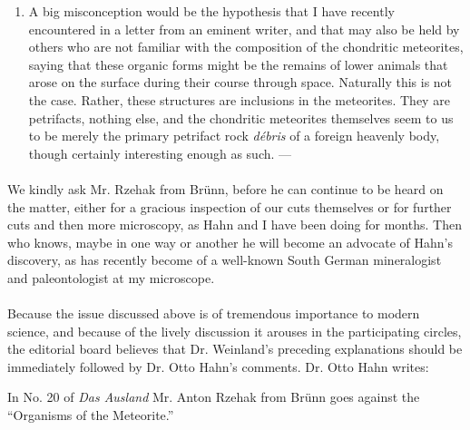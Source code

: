 \documentclass[a4paper, 12pt, oneside]{article}
\begin{document}
\begin{enumerate}
\item A big misconception would be the hypothesis that I have recently encountered in a letter from an eminent writer, and that may also be held by others who are not familiar with the composition of the chondritic meteorites, saying that these organic forms might be the remains of lower animals that arose on the surface during their course through space. Naturally this is not the case. Rather, these structures are inclusions in the meteorites. They are petrifacts, nothing else, and the chondritic meteorites themselves seem to us to be merely the primary petrifact rock \emph{débris} of a foreign heavenly body, though certainly interesting enough as such. ---
\end{enumerate}
\paragraph*{}
We kindly ask Mr. Rzehak from Brünn, before he can continue to be heard on the matter, either for a gracious inspection of our cuts themselves or for further cuts and then more microscopy, as Hahn and I have been doing for months. Then who knows, maybe in one way or another he will become an advocate of Hahn's discovery, as has recently become of a well-known South German mineralogist and paleontologist at my microscope.

%
\textbigcircle%
%

\paragraph*{}
Because the issue discussed above is of tremendous importance to modern science, and because of the lively discussion it arouses in the participating circles, the editorial board believes that Dr. Weinland's preceding explanations should be immediately followed by Dr. Otto Hahn's comments. Dr. Otto Hahn writes:

In No. 20 of \emph{Das Ausland} Mr. Anton Rzehak from Brünn goes against the ``Organisms of the Meteorite.''
\end{document}
